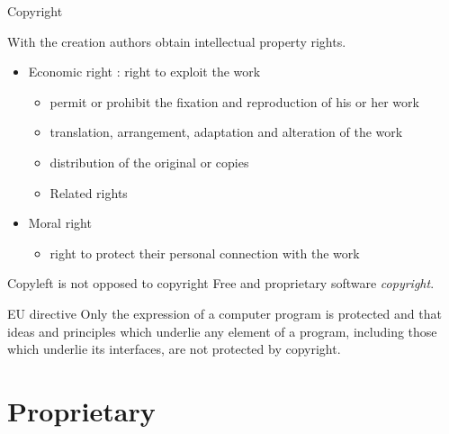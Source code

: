 \documentclass{beamer}
\begin{document}
\begin{frame}{Copyright}

With the creation authors obtain intellectual property rights.

  \begin{itemize}
  \item Economic right : right to exploit the work
    \begin{itemize}
    \item permit or prohibit the fixation and reproduction of his or her work
    \item translation, arrangement, adaptation and alteration of the work
    \item distribution of the original or copies
    \item Related rights
    \end{itemize}
  \item Moral right
    \begin{itemize}
    \item right to protect their personal connection with the work
    
    \end{itemize}
  \end{itemize}

 \begin{alertblock}{Copyleft is not opposed to copyright}
    Free and proprietary software \textit{copyright}.
  \end{alertblock}

  \begin{alertblock}{EU directive}
    Only the expression of a computer program is protected and that ideas and principles which underlie any element of a program, including those which underlie its interfaces, are not protected by copyright.
  \end{alertblock}

\end{frame}


\section{Proprietary}
\end{document}
